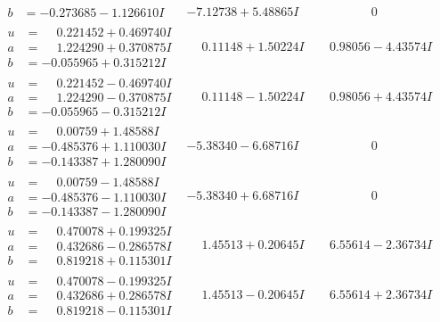 \documentclass[1p]{elsarticle_modified}
\theoremstyle{definition}
\begin{document}
$$\begin{array}{c|c|c}
\begin{aligned}
b &= -0.273685 - 1.126610 I\end{aligned}
 & -7.12738 + 5.48865 I & \phantom{-0.000000 } 0 \\ \hline\begin{aligned}
u &= \phantom{-}0.221452 + 0.469740 I \\
a &= \phantom{-}1.224290 + 0.370875 I \\
b &= -0.055965 + 0.315212 I\end{aligned}
 & \phantom{-}0.11148 + 1.50224 I & \phantom{-}0.98056 - 4.43574 I \\ \hline\begin{aligned}
u &= \phantom{-}0.221452 - 0.469740 I \\
a &= \phantom{-}1.224290 - 0.370875 I \\
b &= -0.055965 - 0.315212 I\end{aligned}
 & \phantom{-}0.11148 - 1.50224 I & \phantom{-}0.98056 + 4.43574 I \\ \hline\begin{aligned}
u &= \phantom{-}0.00759 + 1.48588 I \\
a &= -0.485376 + 1.110030 I \\
b &= -0.143387 + 1.280090 I\end{aligned}
 & -5.38340 - 6.68716 I & \phantom{-0.000000 } 0 \\ \hline\begin{aligned}
u &= \phantom{-}0.00759 - 1.48588 I \\
a &= -0.485376 - 1.110030 I \\
b &= -0.143387 - 1.280090 I\end{aligned}
 & -5.38340 + 6.68716 I & \phantom{-0.000000 } 0 \\ \hline\begin{aligned}
u &= \phantom{-}0.470078 + 0.199325 I \\
a &= \phantom{-}0.432686 - 0.286578 I \\
b &= \phantom{-}0.819218 + 0.115301 I\end{aligned}
 & \phantom{-}1.45513 + 0.20645 I & \phantom{-}6.55614 - 2.36734 I \\ \hline\begin{aligned}
u &= \phantom{-}0.470078 - 0.199325 I \\
a &= \phantom{-}0.432686 + 0.286578 I \\
b &= \phantom{-}0.819218 - 0.115301 I\end{aligned}
 & \phantom{-}1.45513 - 0.20645 I & \phantom{-}6.55614 + 2.36734 I \\ \hline\begin{aligned}

\end{aligned}
\end{array}$$
\end{document}
